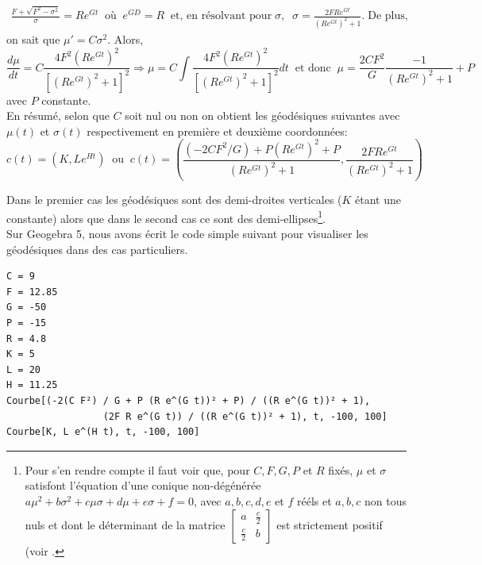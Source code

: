 \documentclass[11pt,french]{article}
\begin{document}
\begin{align*}
    \frac{F+\sqrt{F^2-\sigma^2}}{\sigma}=Re^{Gt}\;\;\text{où}\;\; e^{GD}=R\;\;\text{et, en résolvant pour}\;\sigma,\;\;\sigma=\frac{2FRe^{Gt}}{(Re^{Gt})^2+1}.\;\text{De plus,}
\end{align*}
on sait que $\mu'=C\sigma^2$. Alors,
\begin{equation*}
\frac{d\mu}{dt}=C\frac{4F^2(Re^{Gt})^2}{\left[(Re^{Gt})^2+1\right]^2}\Longrightarrow\mu=C\int\frac{4F^2(Re^{Gt})^2}{\left[(Re^{Gt})^2+1\right]^2}dt\;\;\text{et donc}\;\;\mu=\frac{2CF^2}{G}\frac{-1}{(Re^{Gt})^2+1}+P
\end{equation*}
avec $P$ constante.\\

En résumé, selon que $C$ soit nul ou non on obtient  les géodésiques suivantes avec $\mu(t)$ et $\sigma(t)$ respectivement en première et deuxième coordonnées:
\begin{equation*}
    c(t)=\left(K, Le^{Ht}\right)\;\;\text{ou}\;\;c(t)=\left(\frac{\left(-2CF^2/G\right)+P(Re^{Gt})^2+P}{(Re^{Gt})^2+1}, \frac{2FRe^{Gt}}{(Re^{Gt})^2+1}\right)
\end{equation*}

Dans le premier cas les géodésiques sont des demi-droites verticales ($K$ étant une constante) alors que dans le second cas ce sont des demi-ellipses\footnote{Pour s'en rendre compte il faut voir que, pour $C, F, G, P$ et $R$ fixés, $\mu$ et $\sigma$ satisfont l'équation d'une conique non-dégénérée $a\mu^2+b\sigma^2+c\mu\sigma+d\mu+e\sigma+f=0$, avec $a, b, c, d, e$ et $f$ rééls et $a, b, c$ non tous nuls et dont le déterminant de la matrice $\begin{bmatrix}
    a & \frac{c}{2}
    \\
    \frac{c}{2} & b
    \end{bmatrix}$ est strictement positif (voir \cite[section 1.3]{brannan1999geometry}.}.\\

Sur Geogebra 5, nous avons écrit le code simple suivant pour visualiser les géodésiques dans des cas particuliers.
\begin{verbatim}
C = 9
F = 12.85
G = -50
P = -15
R = 4.8
K = 5
L = 20
H = 11.25
Courbe[(-2(C F²) / G + P (R e^(G t))² + P) / ((R e^(G t))² + 1), 
                 (2F R e^(G t)) / ((R e^(G t))² + 1), t, -100, 100]
Courbe[K, L e^(H t), t, -100, 100]
\end{verbatim}    
\end{document}
